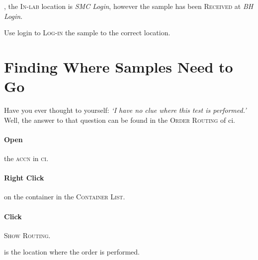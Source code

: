 , the \textsc{In-lab} location is \textit{SMC Login}, however the sample has been \textsc{Received} at \textit{BH Login}.

Use \gls{login} to \textsc{Log-in} the sample to the correct location.


\section{Finding Where Samples Need to Go}

Have you ever thought to yourself: \textit{`I have no clue where this test is performed.'} Well, the answer to that question can be found in the \textsc{Order Routing} of \gls{ci}.

\paragraph{Open} the \textsc{\gls{accn}} in \textsc{\gls{ci}}.

\paragraph{Right Click} on the container in the \textsc{Container List}.

\paragraph{Click} \textsc{Show Routing}.\\


 is the location where the order is performed.\\

